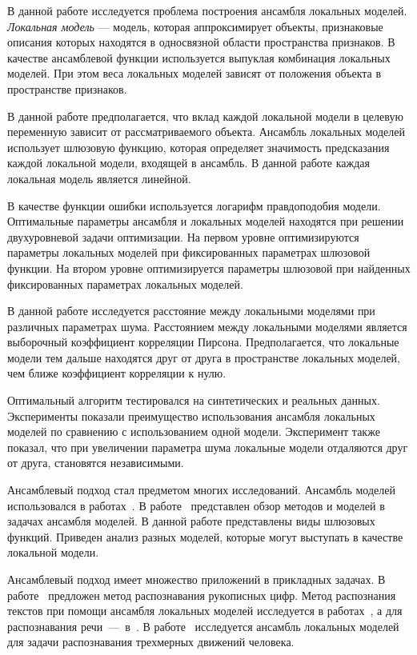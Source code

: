 \documentclass[12pt, twoside]{article}
\begin{document}
В данной работе исследуется проблема построения ансамбля локальных моделей. \textit{Локальная модель} --- модель, которая аппроксимирует объекты, признаковые описания которых находятся в односвязной области пространства признаков. В качестве ансамблевой функции используется выпуклая комбинация локальных моделей. При этом веса локальных моделей зависят от положения объекта в пространстве признаков. 

В данной работе предполагается, что вклад каждой локальной модели в целевую переменную зависит от рассматриваемого объекта. Ансамбль локальных моделей использует шлюзовую функцию, которая определяет значимость предсказания каждой локальной модели, входящей в ансамбль. В данной работе каждая локальная модель является линейной. 

В качестве функции ошибки используется логарифм правдоподобия модели. Оптимальные параметры ансамбля и локальных моделей находятся при решении двухуровневой задачи оптимизации. На первом уровне оптимизируются параметры локальных моделей при фиксированных параметрах шлюзовой функции. На втором уровне оптимизируется параметры шлюзовой при найденных фиксированных параметрах локальных моделей. 

В данной работе исследуется расстояние между локальными моделями при различных параметрах шума. Расстоянием между локальными моделями является выборочный коэффициент корреляции Пирсона. Предполагается, что локальные модели тем дальше находятся друг от друга в пространстве локальных моделей, чем ближе коэффициент корреляции к нулю.

Оптимальный алгоритм тестировался на синтетических и реальных данных.  Эксперименты показали преимущество использования ансамбля локальных моделей по сравнению с использованием одной модели. Эксперимент также показал, что при увеличении параметра шума локальные модели отдаляются друг от друга, становятся независимыми.

Ансамблевый подход стал предметом многих исследований. Ансамбль моделей использовался в работах~\cite{Yumlu2003, Cheung1995, Weigend2000}. В работе~\cite{Yuksel2012} представлен обзор методов и моделей в задачах ансамбля моделей. В данной работе представлены виды шлюзовых функций. Приведен анализ разных моделей, которые могут выступать в качестве локальной модели. 

Ансамблевый подход имеет множество приложений в прикладных задачах. В работе~\cite{article} предложен метод распознавания рукописных цифр. Метод распознания текстов при помощи ансамбля локальных моделей исследуется в работах~\cite{Estabrooks2001}, а для распознавания речи~---~в~\cite{Mossavat2010, Peng1996}. В работе~\cite{Sminchisescu2007} исследуется ансамбль локальных моделей для задачи распознавания трехмерных движений человека.
\end{document}
